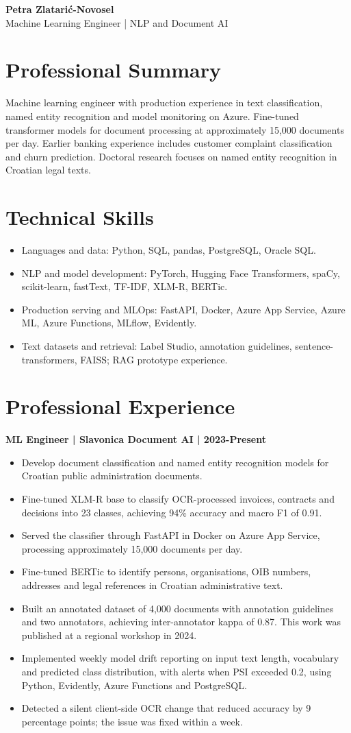 \documentclass[11pt,a4paper]{article}
\newcommand{\cvsection}[1]{\section*{#1}}
\begin{document}
{\LARGE\bfseries\color{primarycolor} Petra Zlatarić-Novosel}\\[0.3em]
{\large\color{accentcolor} Machine Learning Engineer | NLP and Document AI}

\cvsection{Professional Summary}
Machine learning engineer with production experience in text classification, named entity recognition and model monitoring on Azure. Fine-tuned transformer models for document processing at approximately 15,000 documents per day. Earlier banking experience includes customer complaint classification and churn prediction. Doctoral research focuses on named entity recognition in Croatian legal texts.

\cvsection{Technical Skills}
\begin{itemize}
\item Languages and data: Python, SQL, pandas, PostgreSQL, Oracle SQL.
\item NLP and model development: PyTorch, Hugging Face Transformers, spaCy, scikit-learn, fastText, TF-IDF, XLM-R, BERTic.
\item Production serving and MLOps: FastAPI, Docker, Azure App Service, Azure ML, Azure Functions, MLflow, Evidently.
\item Text datasets and retrieval: Label Studio, annotation guidelines, sentence-transformers, FAISS; RAG prototype experience.
\end{itemize}

\cvsection{Professional Experience}
\textbf{ML Engineer | Slavonica Document AI | 2023-Present}
\begin{itemize}
\item Develop document classification and named entity recognition models for Croatian public administration documents.
\item Fine-tuned XLM-R base to classify OCR-processed invoices, contracts and decisions into 23 classes, achieving 94\% accuracy and macro F1 of 0.91.
\item Served the classifier through FastAPI in Docker on Azure App Service, processing approximately 15,000 documents per day.
\item Fine-tuned BERTic to identify persons, organisations, OIB numbers, addresses and legal references in Croatian administrative text.
\item Built an annotated dataset of 4,000 documents with annotation guidelines and two annotators, achieving inter-annotator kappa of 0.87. This work was published at a regional workshop in 2024.
\item Implemented weekly model drift reporting on input text length, vocabulary and predicted class distribution, with alerts when PSI exceeded 0.2, using Python, Evidently, Azure Functions and PostgreSQL.
\item Detected a silent client-side OCR change that reduced accuracy by 9 percentage points; the issue was fixed within a week.
\end{itemize}
\end{document}
